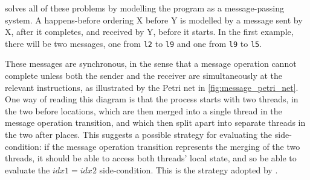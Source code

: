 \Technique{} solves all of these problems by modelling the program as
a message-passing system.  A happens-before ordering X before Y is
modelled by a message sent by X, after it completes, and received by
Y, before it starts.  In the first example, there will be two
messages, one from \texttt{l2} to \texttt{l9} and one from \texttt{l9}
to \texttt{l5}.

These messages are synchronous, in the sense that a message operation
cannot complete unless both the sender and the receiver are
simultaneously at the relevant instructions, as illustrated by the
Petri net in \autoref{fig:message_petri_net}.  One way of reading this diagram is that the
process starts with two threads, in the two before locations, which
are then merged into a single thread in the message operation
transition, and which then split apart into separate threads in the
two after places.  This suggests a possible strategy for evaluating
the side-condition: if the message operation transition represents the
merging of the two threads, it should be able to access both threads'
local state, and so be able to evaluate the $\mathit{idx1} =
\mathit{idx2}$ side-condition.  This is the strategy adopted by
       {\technique}.


